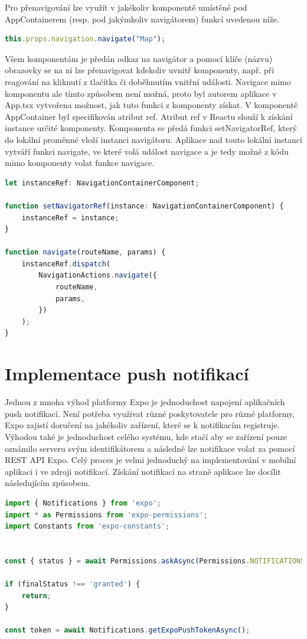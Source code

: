 Pro přenavigování lze využít v jakékoliv komponentě umístěné pod AppContainerem (resp. pod jakýmkoliv navigátorem) funkcí uvedenou níže.

\begin{lstlisting}[language=JavaScript, caption=Přenavigování]
this.props.navigation.navigate("Map");
\end{lstlisting}

Všem komponentám je předán odkaz na navigátor a pomocí klíče (názvu) obrazovky se na ni lze přenavigovat kdekoliv uvnitř komponenty, např. při reagování na kliknutí z tlačítka či doběhnutím vnitřní události. Navigace mimo komponentu ale tímto způsobem není možná, proto byl autorem aplikace v App.tsx vytvořena možnost, jak tuto funkci z komponenty získat. V komponentě AppContainer byl specifikován atribut ref. Atribut ref v Reactu slouží k získání instance určité komponenty. Komponenta se předá funkci setNavigatorRef, který do lokální proměnné vloží instanci navigátoru. Aplikace nad touto lokální instancí vytváří funkci navigate, ve které volá událost navigace a je tedy možné z kódu mimo komponenty volat funkce navigace.

\begin{lstlisting}[language=JavaScript, caption=Přenavigování]
let instanceRef: NavigationContainerComponent;

function setNavigatorRef(instance: NavigationContainerComponent) {
	instanceRef = instance;
}

function navigate(routeName, params) {
	instanceRef.dispatch(
		NavigationActions.navigate({
			routeName,
			params,
		})
	);
}
\end{lstlisting}

\section{Implementace push notifikací}

Jednou z mnoha výhod platformy Expo je jednoduchost napojení aplikačních push notifikací. Není potřeba využívat různé poskytovatele pro různé platformy, Expo zajistí doručení na jakékoliv zařízení, které se k notifikacím registruje. Výhodou také je jednoduchost celého systému, kde stačí aby se zařízení pouze oznámilo serveru svým identifikátorem a následně lze notifikace volat za pomocí REST API Expo. Celý proces je velmi jednoduchý na implementování v mobilní aplikaci i ve zdroji notifikací. Získání notifikací na straně aplikace lze docílit následujícím způsobem.

\begin{lstlisting}[language=JavaScript, caption=Expo notifikace]
import { Notifications } from 'expo';
import * as Permissions from 'expo-permissions';
import Constants from 'expo-constants';


const { status } = await Permissions.askAsync(Permissions.NOTIFICATIONS);

if (finalStatus !== 'granted') {
	return;
}

const token = await Notifications.getExpoPushTokenAsync();
\end{lstlisting}

